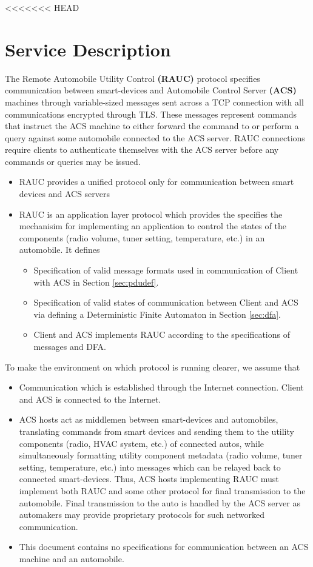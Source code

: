 <<<<<<< HEAD

\section{Service Description}
\label{sec:serv_desc}

The Remote Automobile Utility Control \textbf{(RAUC)} protocol specifies communication between smart-devices and Automobile Control Server \textbf{(ACS)} machines through variable-sized messages sent across a TCP connection with all communications encrypted through TLS. These messages represent commands that instruct the ACS machine to either forward the command to or perform a query against some automobile connected to the ACS server. RAUC connections require clients to authenticate themselves with the ACS server before any commands or queries may be issued.
\begin{itemize}
\item  RAUC provides a unified protocol only for communication between smart devices and ACS servers
\item RAUC is  an application layer protocol which provides the specifies the mechanisim for implementing an application to control the states of the components (radio volume, tuner setting, temperature, etc.) in an automobile. It defines 
\begin{itemize}
\item Specification of valid message formats used in communication of Client with ACS in Section \ref{sec:pdudef}.
\item Specification of valid states of communication between Client and ACS via defining a Deterministic Finite Automaton in Section \ref{sec:dfa}. 
\item Client and ACS implements RAUC according to the specifications of messages and DFA.
\end{itemize}
\end{itemize}

To make the environment on which protocol is running clearer, we assume that 
\begin{itemize}
\item Communication which is established through the Internet connection. Client and ACS is connected to the Internet.
\item ACS hosts act as middlemen between smart-devices and automobiles, translating commands from smart devices and sending them to the utility components (radio, HVAC system, etc.) of connected autos, while simultaneously formatting utility component metadata (radio volume, tuner setting, temperature, etc.) into messages which can be relayed back to connected smart-devices.  Thus, ACS hosts implementing RAUC must implement both RAUC and some other protocol for final transmission to the automobile. Final transmission to the auto is handled by the ACS server as automakers may provide proprietary protocols for such networked communication. 
\item This document contains no specifications for communication between an ACS machine and an automobile.
\end{itemize}


